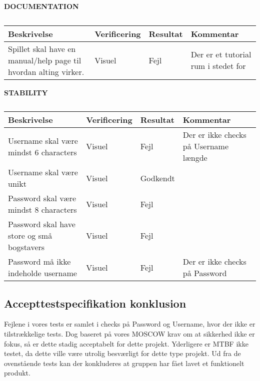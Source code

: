 \bf{DOCUMENTATION}
\begin{table}[H]
\caption{}
\label{tab:}
\begin{tabular}{p{3cm}|p{3cm}|p{3cm}|p{3cm}}
Beskrivelse & Verificering & Resultat & Kommentar \\
\hline
Spillet skal have en manual/help page til hvordan alting virker. & Visuel & Fejl & Der er et tutorial rum i stedet for \\
\hline
\end{tabular}
\end{table}

\bf{STABILITY}
\begin{table}[H]
\caption{}
\label{tab:}
\begin{tabular}{p{3cm}|p{3cm}|p{3cm}|p{3cm}}
Beskrivelse & Verificering & Resultat & Kommentar \\
\hline
 Username skal være mindst 6 characters & Visuel & Fejl & Der er ikke checks på Username længde\\
\hline
 Username skal være unikt & Visuel & Godkendt & \\
\hline
 Password skal være mindst 8 characters & Visuel & Fejl & \\
\hline
 Password skal have store og små bogstavers & Visuel & Fejl & \\
\hline
 Password må ikke indeholde username & Visuel & Fejl & Der er ikke checks på Password \\
\hline
\end{tabular}
\end{table}

\subsection{Accepttestspecifikation konklusion}
Fejlene i vores tests er samlet i checks på Password og Username, hvor der ikke er tilstrækkelige tests. Dog baseret på vores MOSCOW krav om at sikkerhed ikke er fokus, så er dette stadig acceptabelt for dette projekt. Yderligere er MTBF ikke testet, da dette ville være utrolig besværligt for dette type projekt. Ud fra de ovenstående tests kan der konkluderes at gruppen har fået lavet et funktionelt produkt.